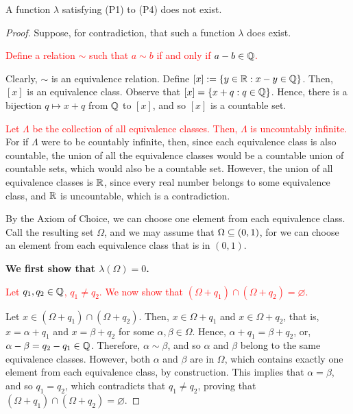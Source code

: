 
\begin{theorem}
    A function $\lambda$ satisfying (P1) to (P4) does not exist.
\end{theorem}

\begin{proof}
Suppose, for contradiction, that such a function $\lambda$ does exist.

\textcolor{red}{Define a relation $\sim$ such that $a \sim b$ if and only if $a - b \in \mathbb{Q}$.}

Clearly, $\sim$ is an equivalence relation. Define $[x] := \{ y \in \mathbb{R} : x - y \in \mathbb{Q} \}$. Then, $[x]$ is an equivalence class. Observe that $[x] = \{ x + q : q \in \mathbb{Q} \}$. Hence, there is a bijection $q \mapsto x + q$ from $\mathbb{Q}$ to $[x]$, and so $[x]$ is a countable set.

\textcolor{red}{Let $\Lambda$ be the collection of all equivalence classes. Then, $\Lambda$ is uncountably infinite.} For if $\Lambda$ were to be countably infinite, then, since each equivalence class is also countable, the union of all the equivalence classes would be a countable union of countable sets, which would also be a countable set. However, the union of all equivalence classes is $\mathbb{R}$, since every real number belongs to some equivalence class, and $\mathbb{R}$ is uncountable, which is a contradiction.

By the Axiom of Choice, we can choose one element from each equivalence class. Call the resulting set $\Omega$, and we may assume that $\Omega \subseteq  (0, 1)$, for we can choose an element from each equivalence class that is in $(0, 1)$. 

\textbf{We first show that $\lambda(\Omega) = 0$.}

\textcolor{red}{Let $q_1, q_2 \in \mathbb{Q}$, $q_1 \neq q_2$. We now show that $(\Omega + q_1) \cap (\Omega + q_2) = \varnothing$.}

Let $x \in (\Omega + q_1) \cap (\Omega + q_2)$. Then, $x \in \Omega + q_1$ and $x \in \Omega + q_2$, that is, $x = \alpha + q_1$ and $x = \beta + q_2$ for some $\alpha, \beta \in \Omega$. Hence, $\alpha + q_1 = \beta + q_2$, or, $\alpha - \beta = q_2 - q_1 \in \mathbb{Q}$. Therefore, $\alpha \sim \beta$, and so $\alpha$ and $\beta$ belong to the same equivalence classes. However, both $\alpha$ and $\beta$ are in $\Omega$, which contains exactly one element from each equivalence class, by construction. This implies that $\alpha = \beta$, and so $q_1 = q_2$, which contradicts that $q_1 \neq q_2$, proving that $(\Omega + q_1) \cap (\Omega + q_2) = \varnothing$. 


\end{proof}
